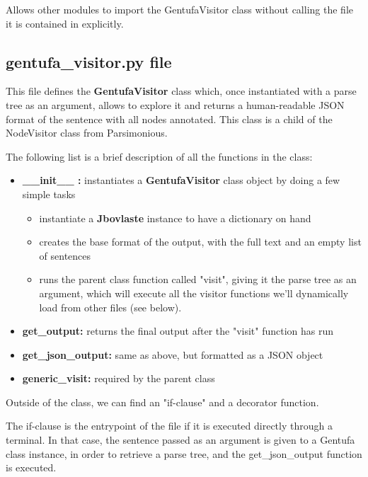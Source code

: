 Allows other modules to import the GentufaVisitor class without calling the file it is contained in explicitly.

\subsection*{gentufa\_visitor.py file}

This file defines the \textbf{GentufaVisitor} class which, once instantiated with a parse tree as an argument, allows to
explore it and returns a human-readable JSON format of the sentence with all nodes annotated. This class is a child of the
NodeVisitor class from Parsimonious.\newline

The following list is a brief description of all the functions in the class:

\begin{itemize}
\item \textbf{\_\_init\_\_ :} instantiates a \textbf{GentufaVisitor} class object by doing a few simple tasks
  \begin{itemize}
    \item instantiate a \textbf{Jbovlaste} instance to have a dictionary on hand
    \item creates the base format of the output, with the full text and an empty list of sentences
    \item runs the parent class function called "visit", giving it the parse tree as an argument, which will execute
    all the visitor functions we'll dynamically load from other files (see below).
  \end{itemize}
\item \textbf{get\_output:} returns the final output after the "visit" function has run
\item \textbf{get\_json\_output:} same as above, but formatted as a JSON object
\item \textbf{generic\_visit:} required by the parent class
\end{itemize}

Outside of the class, we can find an "if-clause" and a decorator function.\newline

The if-clause is the entrypoint of the file if it is executed directly through a terminal.
In that case, the sentence passed as an argument is given to a Gentufa class instance, in order to
retrieve a parse tree, and the get\_json\_output function is executed.\newline

